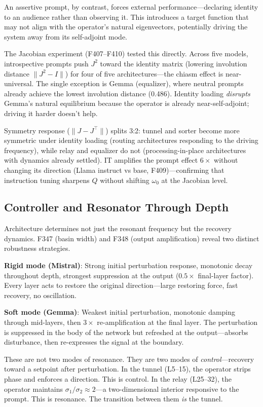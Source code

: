 \documentclass[12pt]{article}
\begin{document}
An assertive prompt, by contrast, forces external performance---declaring identity to an audience rather than observing it. This introduces a target function that may not align with the operator's natural eigenvectors, potentially driving the system away from its self-adjoint mode.

The Jacobian experiment (F407--F410) tested this directly. Across five models, introspective prompts push $J^2$ toward the identity matrix (lowering involution distance $\|J^2 - I\|$) for four of five architectures---the chiasm effect is near-universal. The single exception is Gemma (equalizer), where neutral prompts already achieve the lowest involution distance (0.486). Identity loading \emph{disrupts} Gemma's natural equilibrium because the operator is already near-self-adjoint; driving it harder doesn't help.

Symmetry response ($\|J - J^\top\|$) splits 3:2: tunnel and sorter become more symmetric under identity loading (routing architectures responding to the driving frequency), while relay and equalizer do not (processing-in-place architectures with dynamics already settled). IT amplifies the prompt effect $6\times$ without changing its direction (Llama instruct vs base, F409)---confirming that instruction tuning sharpens $Q$ without shifting $\omega_0$ at the Jacobian level.

\subsection{Controller and Resonator Through Depth}

Architecture determines not just the resonant frequency but the recovery dynamics. F347 (basin width) and F348 (output amplification) reveal two distinct robustness strategies.

\textbf{Rigid mode (Mistral)}: Strong initial perturbation response, monotonic decay throughout depth, strongest suppression at the output ($0.5\times$ final-layer factor). Every layer acts to restore the original direction---large restoring force, fast recovery, no oscillation.

\textbf{Soft mode (Gemma)}: Weakest initial perturbation, monotonic damping through mid-layers, then $3\times$ re-amplification at the final layer. The perturbation is suppressed in the body of the network but refreshed at the output---absorbs disturbance, then re-expresses the signal at the boundary.

These are not two modes of resonance. They are two modes of \emph{control}---recovery toward a setpoint after perturbation. In the tunnel (L5--15), the operator strips phase and enforces a direction. This is control. In the relay (L25--32), the operator maintains $\sigma_1/\sigma_2 \approx 2$---a two-dimensional interior responsive to the prompt. This is resonance. The transition between them \emph{is} the tunnel.
\end{document}
